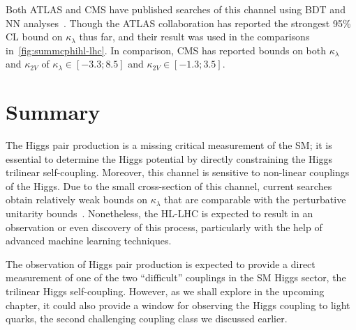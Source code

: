 \par Both ATLAS and CMS have published searches of this channel using  BDT and NN analyses~\cite{ATLAS:2021jki,CMS:2020tkr}. Though the ATLAS collaboration has reported the strongest 95\% CL bound on $\kappa_\lambda$ thus far, and their result was used in the comparisons in~\autoref{fig:summcphihl-lhc}. In comparison, CMS has reported bounds on both $\kappa_\lambda$ and $\kappa_{2V}$ of $\kappa_{\lambda} \in [-3.3;8.5]$ and $\kappa_{2V} \in [-1.3; 3.5]$.                                                                                       

\section{Summary \label{summtrilinear}  }
\par The Higgs pair production is a missing critical measurement of the SM; it is essential to determine the Higgs potential by directly constraining the Higgs trilinear self-coupling. Moreover, this channel is sensitive to non-linear couplings of the Higgs. Due to the small cross-section of this channel, current searches obtain relatively weak bounds on $\kappa_{\lambda}$ that are comparable with the perturbative unitarity bounds~\cite{DiLuzio:2017tfn}. Nonetheless, the HL-LHC is expected to result in an observation or even discovery of this process, particularly with the help of advanced machine learning techniques.
\par  The observation of Higgs pair production is expected to provide a direct measurement of one of the two ``difficult'' couplings in the SM Higgs sector,  the trilinear Higgs self-coupling. However, as we shall explore in the upcoming chapter, it could also provide a window for observing the Higgs coupling to light quarks, the second challenging coupling class we discussed earlier.
